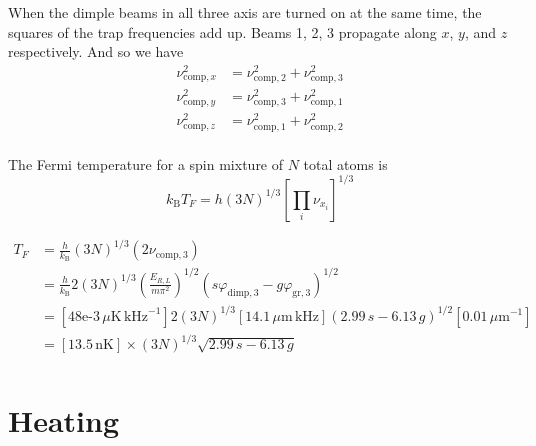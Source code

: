 \vspace{0.5em}
When the dimple beams in all three axis are turned on at the same time, the
squares of the trap frequencies add up.   Beams 1,  2, 3 propagate along $x$,
$y$, and $z$ respectively.  And so we have 
\begin{equation} 
\begin{split} 
  \nu_{\text{comp},x}^{2} & = \nu_{\text{comp},2}^{2} + \nu_{\text{comp},3}^{2} \\ 
  \nu_{\text{comp},y}^{2} & = \nu_{\text{comp},3}^{2} + \nu_{\text{comp},1}^{2} \\ 
  \nu_{\text{comp},z}^{2} & = \nu_{\text{comp},1}^{2} + \nu_{\text{comp},2}^{2} \\ 
\end{split}
\end{equation}

The Fermi temperature for a spin mixture of $N$ total atoms is 
\begin{equation}
 k_{\text{B}} T_{F} = h (3N)^{1/3} \left[ \prod_{i} \nu_{x_{i}} \right]^{1/3}
\end{equation} 

\begin{equation}
\begin{split}
  T_{F} & = \frac{h}{k_{\text{B}}} (3N)^{1/3} 
 \left( 2\nu_{\text{comp},3 } \right) \\ 
 & = \frac{h}{k_{\text{B}}} 2(3N)^{1/3}
 \left( \frac{ E_{R,L}  }{m\pi^{2}} \right)^{1/2}
  ( s\varphi_{\text{dimp},3} - g\varphi_{\text{gr},3}  )^{1/2 }\\ 
 & = \left[ 48\text{e-3}\, \mu\text{K}\,\text{kHz}^{-1}\right]
   2 (3N)^{1/3}  
  \left[ 14.1 \, \mu\text{m}\,\text{kHz} \right]
  ( 2.99\, s - 6.13\, g )^{1/2 }
   \left[ 0.01 \, \mu\text{m}^{-1} \right] 
   \\ 
  & =  [ 13.5 \,\text{nK}  ] \times (3N)^{1/3} \sqrt{2.99\,s-6.13\,g} \, \\ 
\end{split} 
\end{equation} 


\section{Heating}


